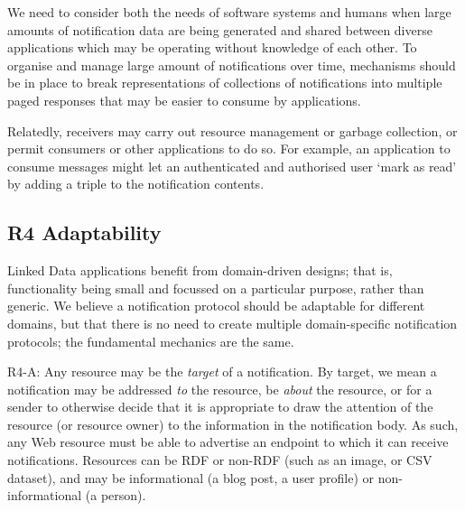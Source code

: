 \documentclass[a4paper]{llncs}
\begin{document}
\par We need to consider both the needs of software systems and humans when large amounts of notification data are being generated and shared between diverse applications which may be operating without knowledge of each other. To organise and manage large amount of notifications over time, mechanisms should be in place to break representations of collections of notifications into multiple paged responses that may be easier to consume by applications.


\par Relatedly, receivers may carry out resource management or garbage collection, or permit consumers or other applications to do so. For example, an application to consume messages might let an authenticated and authorised user ‘mark as read’ by adding a triple to the notification contents.




                                \subsection{R4 Adaptability}
  \label{adaptability}





\par Linked Data applications benefit from domain-driven designs; that is, functionality being small and focussed on a particular purpose, rather than generic. We believe a notification protocol should be adaptable for different domains, but that there is no need to create multiple domain-specific notification protocols; the fundamental mechanics are the same.


\par R4-A: Any resource may be the {\em target} of a notification. By target, we mean a notification may be addressed {\em to} the resource, be {\em about} the resource, or for a sender to otherwise decide that it is appropriate to draw the attention of the resource (or resource owner) to the information in the notification body. As such, any Web resource must be able to advertise an endpoint to which it can receive notifications. Resources can be RDF or non-RDF (such as an image, or CSV dataset), and may be informational (a blog post, a user profile) or non-informational (a person).
\end{document}
